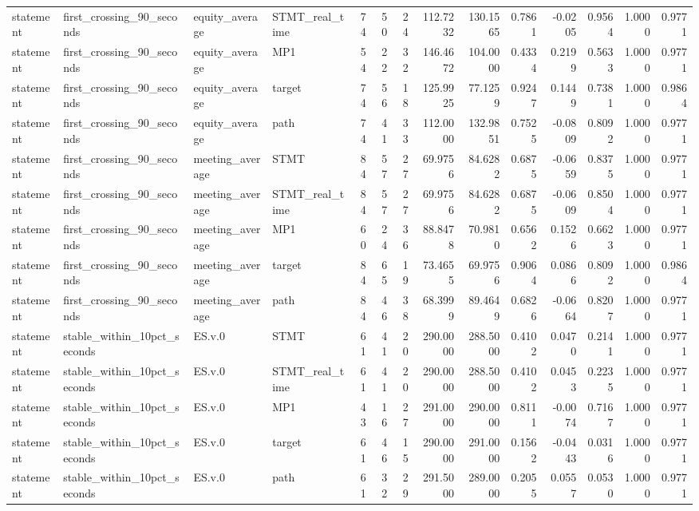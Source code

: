 \begin{tabular}{llllrrrrrrrrrr}
statement & first_crossing_90_seconds & equity_average & STMT_real_time & 74 & 50 & 24 & 112.7232 & 130.1565 & 0.7861 & -0.0205 & 0.9564 & 1.0000 & 0.9771 \\
statement & first_crossing_90_seconds & equity_average & MP1 & 54 & 22 & 32 & 146.4672 & 104.0000 & 0.4334 & 0.2199 & 0.5633 & 1.0000 & 0.9771 \\
statement & first_crossing_90_seconds & equity_average & target & 74 & 56 & 18 & 125.9925 & 77.1259 & 0.9247 & 0.1449 & 0.7381 & 1.0000 & 0.9864 \\
statement & first_crossing_90_seconds & equity_average & path & 74 & 41 & 33 & 112.0000 & 132.9851 & 0.7525 & -0.0809 & 0.8092 & 1.0000 & 0.9771 \\
statement & first_crossing_90_seconds & meeting_average & STMT & 84 & 57 & 27 & 69.9756 & 84.6282 & 0.6875 & -0.0659 & 0.8375 & 1.0000 & 0.9771 \\
statement & first_crossing_90_seconds & meeting_average & STMT_real_time & 84 & 57 & 27 & 69.9756 & 84.6282 & 0.6875 & -0.0609 & 0.8504 & 1.0000 & 0.9771 \\
statement & first_crossing_90_seconds & meeting_average & MP1 & 60 & 24 & 36 & 88.8478 & 70.9810 & 0.6562 & 0.1526 & 0.6623 & 1.0000 & 0.9771 \\
statement & first_crossing_90_seconds & meeting_average & target & 84 & 65 & 19 & 73.4655 & 69.9756 & 0.9064 & 0.0866 & 0.8092 & 1.0000 & 0.9864 \\
statement & first_crossing_90_seconds & meeting_average & path & 84 & 46 & 38 & 68.3999 & 89.4649 & 0.6826 & -0.0664 & 0.8207 & 1.0000 & 0.9771 \\
statement & stable_within_10pct_seconds & ES.v.0 & STMT & 61 & 41 & 20 & 290.0000 & 288.5000 & 0.4102 & 0.0470 & 0.2141 & 1.0000 & 0.9771 \\
statement & stable_within_10pct_seconds & ES.v.0 & STMT_real_time & 61 & 41 & 20 & 290.0000 & 288.5000 & 0.4102 & 0.0453 & 0.2235 & 1.0000 & 0.9771 \\
statement & stable_within_10pct_seconds & ES.v.0 & MP1 & 43 & 16 & 27 & 291.0000 & 290.0000 & 0.8111 & -0.0074 & 0.7167 & 1.0000 & 0.9771 \\
statement & stable_within_10pct_seconds & ES.v.0 & target & 61 & 46 & 15 & 290.0000 & 291.0000 & 0.1562 & -0.0443 & 0.0316 & 1.0000 & 0.9771 \\
statement & stable_within_10pct_seconds & ES.v.0 & path & 61 & 32 & 29 & 291.5000 & 289.0000 & 0.2055 & 0.0557 & 0.0530 & 1.0000 & 0.9771 \\

\end{tabular}

